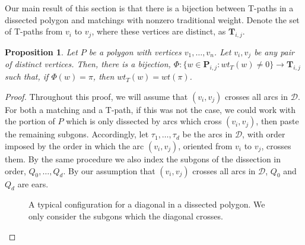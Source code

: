 \documentclass[12pt]{article}
\newtheorem{proposition}{Proposition}
\theoremstyle{remark}
\newcommand*{\pathset}[2]{\mathbf{P}_{#1,#2}}
\newcommand*{\D}{\mathcal{D}}
\begin{document}
Our main result of this section is that there is a bijection between T-paths in a dissected polygon and matchings with nonzero traditional weight. Denote the set of T-paths from $v_i$ to $v_j$, where these vertices are distinct, as $\textbf{T}_{i,j}$.

\begin{proposition}\label{prop:Tpath}
Let $P$ be a polygon with vertices $v_1,\ldots,v_n$. Let $v_i,v_j$ be any pair of distinct vertices. Then, there is a bijection, $\Phi: \{w \in \pathset{i}{j}: wt_T(w) \neq 0 \} \to \textbf{T}_{i,j}$ such that, if $\Phi(w) = \pi$, then $wt_T(w) = wt(\pi)$.
\end{proposition}

\begin{proof}
Throughout this proof, we will assume that $(v_i,v_j)$ crosses all arcs in $\D$. For both a matching and a T-path, if this was not the case, we could work with the portion of $P$ which is only dissected by arcs which cross $(v_i,v_j)$, then paste the remaining subgons. Accordingly, let $\tau_1,\ldots,\tau_d$ be the arcs in $\D$, with order imposed by the order in which the arc $(v_i,v_j)$, oriented from $v_i$ to $v_j$, crosses them. By the same procedure we also index the subgons of the dissection in order, $Q_0,\ldots,Q_d$. By our assumption that $(v_i,v_j)$ crosses all arcs in $\D$, $Q_0$ and $Q_d$ are ears. 

\begin{figure}
    \centering
{}
    \caption{A typical configuration for a diagonal in a dissected polygon. We only consider the subgons which the diagonal crosses.}
    \label{fig:my_label}
\end{figure}


\end{proof}
\end{document}
